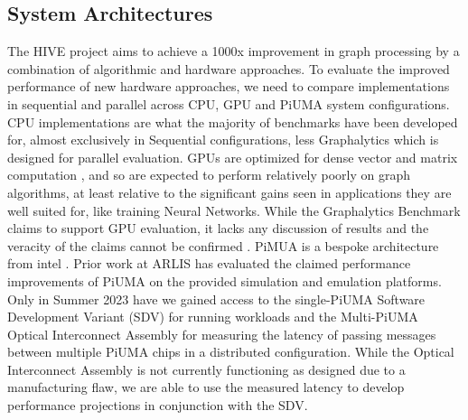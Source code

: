 \documentclass[letterpaper, 10pt]{article}
\begin{document}
\begin{multicols}{2}
        \subsection{System Architectures}\label{section:architecutres}
        The HIVE project aims to achieve a 1000x improvement in graph processing by a combination of algorithmic and hardware approaches. 
        To evaluate the improved performance of new hardware approaches, we need to compare implementations in sequential and parallel across CPU, GPU and PiUMA system configurations. 
        CPU implementations are what the majority of benchmarks have been developed for, almost exclusively in Sequential configurations, less Graphalytics \cite{Capota2015} which is designed for parallel evaluation. 
        GPUs are optimized for dense vector and matrix computation \cite{Dally2021}, and so are expected to perform relatively poorly on graph algorithms, at least relative to the significant gains seen in applications they are well suited for, like training Neural Networks. While the Graphalytics Benchmark claims to support GPU evaluation, it lacks any discussion of results and the veracity of the claims cannot be confirmed \cite{Capota2015}.
        PiMUA is a bespoke architecture from intel \cite{Aananthakrishnan2020}. 
        Prior work at ARLIS has evaluated the claimed performance improvements of PiUMA on the provided simulation and emulation platforms. 
        Only in Summer 2023 have we gained access to the single-PiUMA Software Development Variant (SDV) for running workloads and the Multi-PiUMA Optical Interconnect Assembly for measuring the latency of passing messages between multiple PiUMA chips in a distributed configuration. 
        While the Optical Interconnect Assembly is not currently functioning as designed due to a manufacturing flaw, we are able to use the measured latency to develop performance projections in conjunction with the SDV. 
        

\end{multicols}
\end{document}
